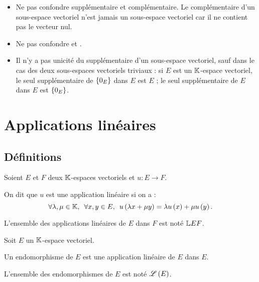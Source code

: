 \begin{rem}
\begin{itemize}
\item Ne pas confondre supplémentaire et complémentaire. Le complémentaire d'un sous-espace vectoriel n'est jamais un sous-espace vectoriel car il ne contient pas le vecteur nul. \\

\item Ne pas confondre  et . \\

\item Il n'y a pas unicité du supplémentaire d'un sous-espace vectoriel, sauf dans le cas des deux sous-espaces vectoriels triviaux : si \(E\) est un \(\mathbb{K}\)-espace vectoriel, le seul supplémentaire de \(\left\lbrace0_E\right\rbrace\) dans \(E\) est \(E\) ; le seul supplémentaire de \(E\) dans \(E\) est \(\left\lbrace0_E\right\rbrace\).
\end{itemize}
\end{rem}

\section{Applications linéaires}

\subsection{Définitions}

\begin{defi}
Soient \(E\) et \(F\) deux \(\mathbb{K}\)-espaces vectoriels et \(u:E\to F\).

On dit que \(u\) est une application linéaire si on a : \[\quantifs{\forall\lambda,\mu\in\K;\forall x,y\in E}u\paren{\lambda x+\mu y}=\lambda u\paren{x}+\mu u\paren{y}.\]

L'ensemble des applications linéaires de \(E\) dans \(F\) est noté \(\mathbb{L}{E}{F}\).
\end{defi}

\begin{defi}[Endomorphisme]
Soit \(E\) un \(\mathbb{K}\)-espace vectoriel.

Un endomorphisme de \(E\) est une application linéaire de \(E\) dans \(E\).

L'ensemble des endomorphismes de \(E\) est noté \(\mathscr{L}\left(E\right)\).
\end{defi}


